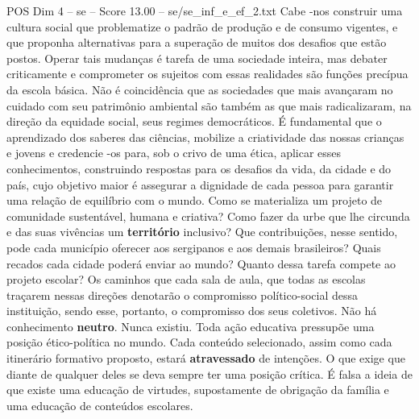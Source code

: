 \begin{textsample}{POS Dim 4 – se – Score 13.00 – se/se\_inf\_e\_ef\_2.txt}
Cabe -nos construir uma cultura social que problematize o padrão de produção e de consumo vigentes, e que proponha alternativas para a superação de muitos dos desafios que estão postos.
Operar tais mudanças é tarefa de uma sociedade inteira, mas debater criticamente e comprometer os sujeitos com essas realidades são funções precípua da escola básica.
Não é coincidência que as sociedades que mais avançaram no cuidado com seu patrimônio ambiental são também as que mais radicalizaram, na direção da equidade social, seus regimes democráticos.
É fundamental que o aprendizado dos saberes das ciências, mobilize a criatividade das nossas crianças e jovens e credencie -os para, sob o crivo de uma ética, aplicar esses conhecimentos, construindo respostas para os desafios da vida, da cidade e do país, cujo objetivo maior é assegurar a dignidade de cada pessoa para garantir uma relação de equilíbrio com o mundo.
Como se materializa um projeto de comunidade sustentável, humana e criativa?
Como fazer da urbe que lhe circunda e das suas vivências um \textbf{território} inclusivo?
Que contribuições, nesse sentido, pode cada município oferecer aos sergipanos e aos demais brasileiros?
Quais recados cada cidade poderá enviar ao mundo?
Quanto dessa tarefa compete ao projeto escolar?
Os caminhos que cada sala de aula, que todas as escolas traçarem nessas direções denotarão o compromisso político-social dessa instituição, sendo esse, portanto, o compromisso dos seus coletivos.
Não há conhecimento \textbf{neutro}.
Nunca existiu.
Toda ação educativa pressupõe uma posição ético-política no mundo.
Cada conteúdo selecionado, assim como cada itinerário formativo proposto, estará \textbf{atravessado} de intenções.
O que exige que diante de qualquer deles se deva sempre ter uma posição crítica.
É falsa a ideia de que existe uma educação de virtudes, supostamente de obrigação da família e uma educação de conteúdos escolares.

\end{textsample}
